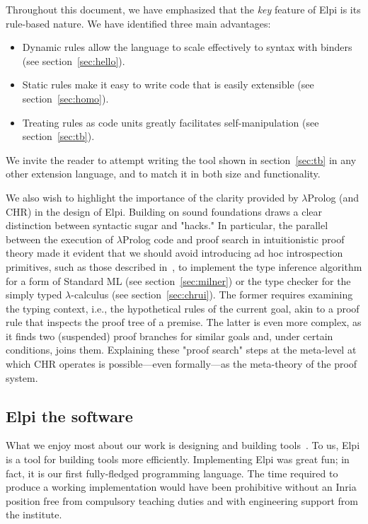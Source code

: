 \documentclass[a4paper, 11pt]{book}
\begin{document}
Throughout this document, we have emphasized that the \emph{key} feature of Elpi
is its rule-based nature. We have identified three main advantages:
\begin{itemize}
\item Dynamic rules allow the language to scale effectively to syntax with binders (see section~\ref{sec:hello}).
\item Static rules make it easy to write code that is easily extensible (see section~\ref{sec:homo}).
\item Treating rules as code units greatly facilitates self-manipulation (see section~\ref{sec:tb}).
\end{itemize}

We invite the reader to attempt writing the  tool shown in
section~\ref{sec:tb} in any other extension language, and to match it in both
size and functionality.

We also wish to highlight the importance of the clarity provided by
$\lambda$Prolog (and CHR) in the design of Elpi. Building on sound foundations
draws a clear distinction between syntactic sugar and "hacks." In particular,
the parallel between the execution of $\lambda$Prolog code and proof search in
intuitionistic proof theory made it evident that we should avoid introducing ad
hoc introspection primitives, such as those described in~\cite[Section 8 and
later]{10.1145/3236788}, to implement the type inference algorithm for a form
of Standard ML (see section~\ref{sec:milner}) or the type checker for the
simply typed $\lambda$-calculus (see section~\ref{sec:chrui}). The former
requires examining the typing context, i.e., the hypothetical rules of the
current goal, akin to a proof rule that inspects the proof tree of a premise.
The latter is even more complex, as it finds two (suspended) proof branches for
similar goals and, under certain conditions, joins them. Explaining these
"proof search" steps at the meta-level at which CHR operates is possible—even
formally—as the meta-theory of the proof system.


\subsection{Elpi the software}


What we enjoy most about our work is designing and building tools~\cite{DBLP:journals/jar/AspertiCTZ07,gonthier:inria-00258384,Coq-refman}.
To us, Elpi is a tool for building tools more efficiently. Implementing Elpi was great fun; in fact, it is our first fully-fledged programming language. The time required to produce a working implementation would have been prohibitive without an Inria position free from compulsory teaching duties and with engineering support from the institute. %
\end{document}
